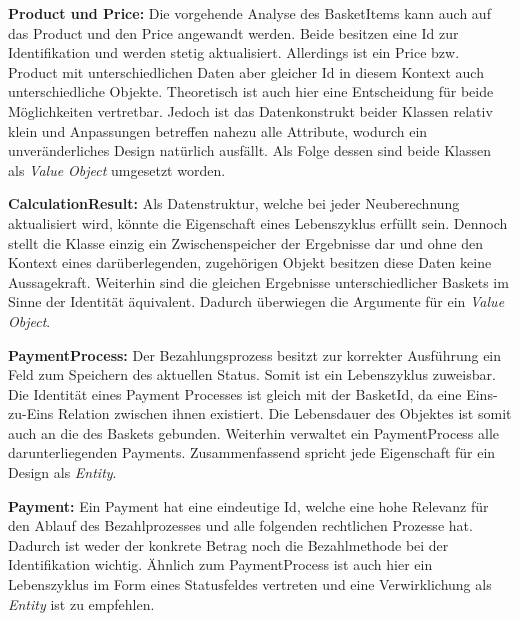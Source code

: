 {	\item \textbf{Product und Price: } {Die vorgehende Analyse des BasketItems kann auch auf das Product und den Price angewandt werden. Beide besitzen eine Id zur Identifikation und werden stetig aktualisiert. Allerdings ist ein Price bzw. Product mit unterschiedlichen Daten aber gleicher Id in diesem Kontext auch unterschiedliche Objekte. Theoretisch ist auch hier eine Entscheidung für beide Möglichkeiten vertretbar. Jedoch ist das Datenkonstrukt beider Klassen relativ klein und Anpassungen betreffen nahezu alle Attribute, wodurch ein unveränderliches Design natürlich ausfällt. Als Folge dessen sind beide Klassen als \emph{Value Object} umgesetzt worden. }
	\item \textbf{CalculationResult: } {Als Datenstruktur, welche bei jeder Neuberechnung aktualisiert wird, könnte die Eigenschaft eines Lebenszyklus erfüllt sein. Dennoch stellt die Klasse einzig ein Zwischenspeicher der Ergebnisse dar und ohne den Kontext eines darüberlegenden, zugehörigen Objekt besitzen diese Daten keine Aussagekraft. Weiterhin sind die gleichen Ergebnisse unterschiedlicher Baskets im Sinne der Identität äquivalent. Dadurch überwiegen die Argumente für ein \emph{Value Object}.}
	\item \textbf{PaymentProcess: } {Der Bezahlungsprozess besitzt zur korrekter Ausführung ein Feld zum Speichern des aktuellen Status. Somit ist ein Lebenszyklus zuweisbar. Die Identität eines Payment Processes ist gleich mit der BasketId, da eine Eins-zu-Eins Relation zwischen ihnen existiert. Die Lebensdauer des Objektes ist somit auch an die des Baskets gebunden. Weiterhin verwaltet ein PaymentProcess alle darunterliegenden Payments. Zusammenfassend spricht jede Eigenschaft für ein Design als \emph{Entity}.}
	\item \textbf{Payment: } {Ein Payment hat eine eindeutige Id, welche eine hohe Relevanz für den Ablauf des Bezahlprozesses und alle folgenden rechtlichen Prozesse hat. Dadurch ist weder der konkrete Betrag noch die Bezahlmethode bei der Identifikation wichtig. Ähnlich zum PaymentProcess ist auch hier ein Lebenszyklus im Form eines Statusfeldes vertreten und eine Verwirklichung als \emph{Entity} ist zu empfehlen.}
}




